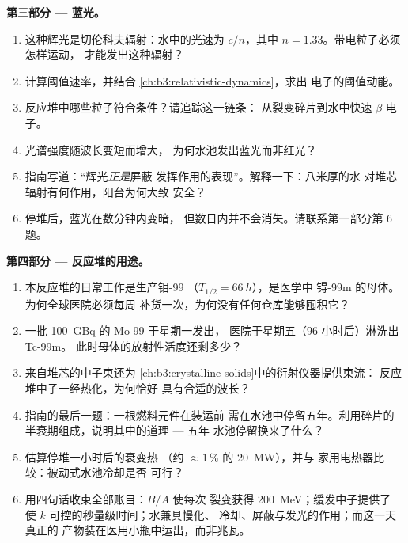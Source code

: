 \begin{problem}
\medskip\noindent\textbf{第三部分 --- 蓝光。}

\begin{enumerate}[resume]
  \item 这种辉光是切伦科夫辐射：水中的光速为
        $c/n$，其中 $n = 1.33$。带电粒子必须怎样运动，
        才能发出这种辐射？
  \item 计算阈值速率，并结合
        \cref{ch:b3:relativistic-dynamics}，求出
        电子的阈值动能。
  \item 反应堆中哪些粒子符合条件？请追踪这一链条：
        从裂变碎片到水中快速 $\beta$ 电子。
  \item 光谱强度随波长变短而增大，
        为何水池发出蓝光而非红光？
  \item 指南写道：“辉光\emph{正是}屏蔽
        发挥作用的表现”。解释一下：八米厚的水
        对堆芯辐射有何作用，阳台为何大致
        安全？
  \item 停堆后，蓝光在数分钟内变暗，
        但数日内并不会消失。请联系第一部分第 6 题。
\end{enumerate}

\medskip\noindent\textbf{第四部分 --- 反应堆的用途。}

\begin{enumerate}[resume]
  \item 本反应堆的日常工作是生产钼-99
        （$T_{1/2} = \qty{66}{h}$），是医学中
        锝-99m 的母体。为何全球医院必须每周
        补货一次，为何没有任何仓库能够囤积它？
  \item 一批 \qty{100}{GBq} 的 Mo-99 于星期一发出，
        医院于星期五（96 小时后）淋洗出 Tc-99m。
        此时母体的放射性活度还剩多少？
  \item 来自堆芯的中子束还为
        \cref{ch:b3:crystalline-solids}中的衍射仪器提供束流：
        反应堆中子一经热化，为何恰好
        具有合适的波长？
  \item 指南的最后一题：一根燃料元件在装运前
        需在水池中停留五年。利用碎片的
        半衰期组成，说明其中的道理 --- 五年
        水池停留换来了什么？
  \item 估算停堆一小时后的衰变热
        （约 $\approx1\,\%$ 的 \qty{20}{MW}），并与
        家用电热器比较：被动式水池冷却是否
        可行？
  \item 用四句话收束全部账目：$B/A$ 使每次
        裂变获得 \qty{200}{MeV}；缓发中子提供了
        使 $k$ 可控的秒量级时间；水兼具慢化、
        冷却、屏蔽与发光的作用；而这一天真正的
        产物装在医用小瓶中运出，而非兆瓦。
\end{enumerate}
\end{problem}
